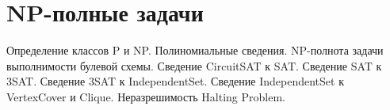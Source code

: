 \section{NP-полные задачи}
Определение классов P и NP.
Полиномиальные сведения.
NP-полнота задачи выполнимости булевой схемы.
Сведение CircuitSAT к SAT.
Сведение SAT к 3SAT.
Сведение 3SAT к IndependentSet.
Сведение IndependentSet к VertexCover и Clique.
Неразрешимость Halting Problem.

